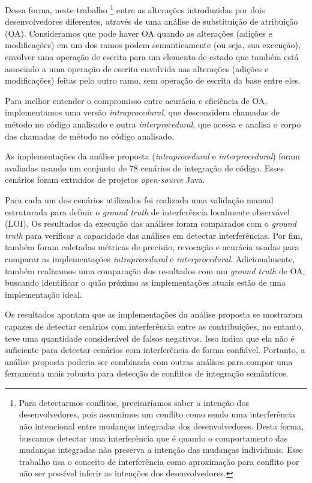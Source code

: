 Dessa forma, neste trabalho \footnote{Para detectarmos conflitos, precisaríamos saber a intenção dos desenvolvedores, pois assumimos um conflito como sendo uma interferência não intencional entre mudanças integradas dos desenvolvedores. Desta forma, buscamos detectar uma interferência que é quando o comportamento das mudanças integradas não preserva a intenção das mudanças individuais. Esse trabalho usa o conceito de interferência como aproximação para conflito por não ser possível inferir as intenções dos desenvolvedores.} entre as alterações introduzidas por dois desenvolvedores diferentes, através de uma análise de substituição de atribuição (OA). Consideramos que pode haver OA quando as alterações (adições e modificações) em um dos ramos podem semanticamente (ou seja, sua execução), envolver uma operação de escrita para um elemento de estado que também está associado a uma operação de escrita envolvida nas alterações (adições e modificações) feitas pelo outro ramo, sem operação de escrita da base entre eles.

Para melhor entender o compromisso entre acurácia e eficiência de OA, implementamos uma versão \emph{intraprocedural}, que desconsidera chamadas de método no código analisado e outra \emph{interprocedural}, que  acessa e analisa o corpo das chamadas de método no código analisado.

As implementações da análise proposta (\emph{intraprocedural} e \emph{interprocedural}) foram avaliadas usando um conjunto de 78 cenários de integração de código. Esses cenários foram extraídos de projetos \emph{open-source} Java.

Para cada um dos cenários utilizados foi realizada uma validação manual estruturada para definir o \emph{ground truth} de interferência localmente observável (LOI). Os resultados da execução das análises foram comparados com o \emph{ground truth} para verificar a capacidade das análises em detectar interferências. Por fim, também foram coletadas métricas de precisão, revocação e acurácia usadas para comparar as implementações \emph{intraprocedural} e \emph{interprocedural}. Adicionalmente, também realizamos uma comparação dos resultados com um \emph{ground truth} de OA, buscando identificar o quão próximo as implementações atuais estão de uma implementação ideal.    

Os resultados apontam que as implementações da análise proposta se mostraram capazes de detectar cenários com interferência entre as contribuições, no entanto, teve uma quantidade considerável de falsos negativos. Isso indica que ela não é suficiente para detectar cenários com interferência de forma confiável. Portanto, a análise proposta poderia ser combinada com outras análises para compor uma ferramenta mais robusta para detecção de conflitos de integração semânticos. 